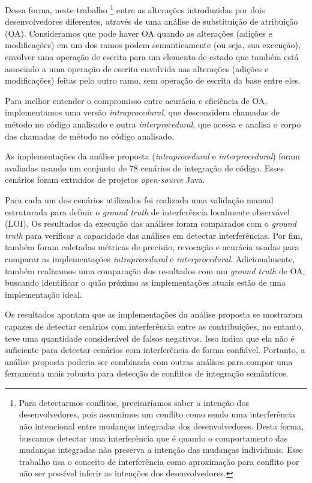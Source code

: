 Dessa forma, neste trabalho \footnote{Para detectarmos conflitos, precisaríamos saber a intenção dos desenvolvedores, pois assumimos um conflito como sendo uma interferência não intencional entre mudanças integradas dos desenvolvedores. Desta forma, buscamos detectar uma interferência que é quando o comportamento das mudanças integradas não preserva a intenção das mudanças individuais. Esse trabalho usa o conceito de interferência como aproximação para conflito por não ser possível inferir as intenções dos desenvolvedores.} entre as alterações introduzidas por dois desenvolvedores diferentes, através de uma análise de substituição de atribuição (OA). Consideramos que pode haver OA quando as alterações (adições e modificações) em um dos ramos podem semanticamente (ou seja, sua execução), envolver uma operação de escrita para um elemento de estado que também está associado a uma operação de escrita envolvida nas alterações (adições e modificações) feitas pelo outro ramo, sem operação de escrita da base entre eles.

Para melhor entender o compromisso entre acurácia e eficiência de OA, implementamos uma versão \emph{intraprocedural}, que desconsidera chamadas de método no código analisado e outra \emph{interprocedural}, que  acessa e analisa o corpo das chamadas de método no código analisado.

As implementações da análise proposta (\emph{intraprocedural} e \emph{interprocedural}) foram avaliadas usando um conjunto de 78 cenários de integração de código. Esses cenários foram extraídos de projetos \emph{open-source} Java.

Para cada um dos cenários utilizados foi realizada uma validação manual estruturada para definir o \emph{ground truth} de interferência localmente observável (LOI). Os resultados da execução das análises foram comparados com o \emph{ground truth} para verificar a capacidade das análises em detectar interferências. Por fim, também foram coletadas métricas de precisão, revocação e acurácia usadas para comparar as implementações \emph{intraprocedural} e \emph{interprocedural}. Adicionalmente, também realizamos uma comparação dos resultados com um \emph{ground truth} de OA, buscando identificar o quão próximo as implementações atuais estão de uma implementação ideal.    

Os resultados apontam que as implementações da análise proposta se mostraram capazes de detectar cenários com interferência entre as contribuições, no entanto, teve uma quantidade considerável de falsos negativos. Isso indica que ela não é suficiente para detectar cenários com interferência de forma confiável. Portanto, a análise proposta poderia ser combinada com outras análises para compor uma ferramenta mais robusta para detecção de conflitos de integração semânticos. 